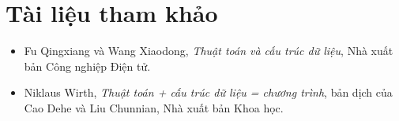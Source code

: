 \documentclass[11pt]{article}
\begin{document}
\section*{Tài liệu tham khảo}

\begin{itemize}
  \item Fu Qingxiang và Wang Xiaodong, \textit{Thuật toán và cấu trúc dữ liệu},
  Nhà xuất bản Công nghiệp Điện tử.
  \item Niklaus Wirth, \textit{Thuật toán + cấu trúc dữ liệu = chương trình},
  bản dịch của Cao Dehe và Liu Chunnian, Nhà xuất bản Khoa học.
\end{itemize}
\end{document}

